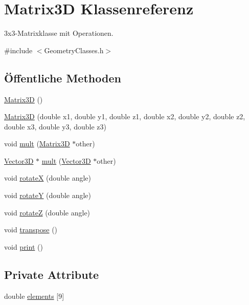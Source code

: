 \hypertarget{classMatrix3D}{\section{Matrix3\-D Klassenreferenz}
\label{classMatrix3D}
}


3x3-\/\-Matrixklasse mit Operationen.  




{\ttfamily \#include $<$Geometry\-Classes.\-h$>$}

\subsection*{Öffentliche Methoden}
\begin{DoxyCompactItemize}
\item 
\hyperlink{classMatrix3D_afe9c6b7abe858fe9f6aea8f0607a00a7}{Matrix3\-D} ()
\item 
\hyperlink{classMatrix3D_abd8f512d6fdfda45bfe655ae38cde303}{Matrix3\-D} (double x1, double y1, double z1, double x2, double y2, double z2, double x3, double y3, double z3)
\item 
void \hyperlink{classMatrix3D_a399be81028219044a03439b2ff93782a}{mult} (\hyperlink{classMatrix3D}{Matrix3\-D} $\ast$other)
\item 
\hyperlink{classVector3D}{Vector3\-D} $\ast$ \hyperlink{classMatrix3D_adb30531e4dd89eb99ed2fb7f94269122}{mult} (\hyperlink{classVector3D}{Vector3\-D} $\ast$other)
\item 
void \hyperlink{classMatrix3D_ada7ce7ea9f2d0ef0fdda60ad73dad345}{rotate\-X} (double angle)
\item 
void \hyperlink{classMatrix3D_a649e1aa65466df65d63f1aef934e5fad}{rotate\-Y} (double angle)
\item 
void \hyperlink{classMatrix3D_ad1933b95fb776dd31ad1b81d3515b029}{rotate\-Z} (double angle)
\item 
void \hyperlink{classMatrix3D_a0d59cb6ea927264477a10b9d427966d6}{transpose} ()
\item 
void \hyperlink{classMatrix3D_a33c771d35de761fafc619773e1b253c5}{print} ()
\end{DoxyCompactItemize}
\subsection*{Private Attribute}
\begin{DoxyCompactItemize}
\item 
double \hyperlink{classMatrix3D_aa24b85b09060684ec1559f22857ccfee}{elements} \mbox{[}9\mbox{]}
\end{DoxyCompactItemize}


